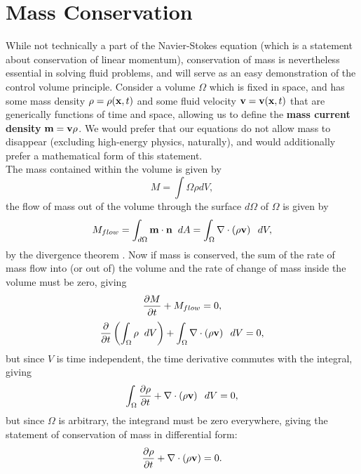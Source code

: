 \section{Mass Conservation}
While not technically a part of the Navier-Stokes equation (which is a statement about conservation of linear momentum), conservation of mass is nevertheless essential in solving fluid problems, and will serve as an easy demonstration of the control volume principle. Consider a volume $\Omega$ which is fixed in space, and has some mass density $\rho = \rho(\mathbf{x},t)$ and some fluid velocity $\mathbf{v} = \mathbf{v}(\mathbf{x} ,t)$ that are generically functions of time and space, allowing us to define the {\bf mass current density} $\mathbf{m} = \mathbf{v}\rho$. We would prefer that our equations do not allow mass to disappear (excluding high-energy physics, naturally), and would additionally prefer a mathematical form of this statement. \\

The mass contained within the volume is given by 
\begin{equation}
M = \int{\Omega}{}{\rho}{dV},
\end{equation}
the flow of mass out of the volume through the surface $d\Omega$ of $\Omega$ is given by 
\begin{equation}
M_{flow} = \int{d\Omega}{}{\Vector{m}\cdot\Vector{n}}{dA} = \int{\Omega}{}{\Div{\paren{\rho\Vector{v}}}}{dV},
\end{equation}
by the divergence theorem .  Now if mass is conserved, the sum of the rate of mass flow into (or out of) the volume and the rate of change of mass inside the volume must be zero, giving
\begin{equation}
\pder{1}{M}{t} + M_{flow} = 0,
\end{equation}
\begin{equation}
\pder{1}{}{t}\paren{\int{\Omega}{}{\rho}{dV}} + \int{\Omega}{}{\Div{\paren{\rho\Vector{v}}}}{dV} =0,
\end{equation}
but since $V$ is time independent, the time derivative commutes with the integral, giving 
\begin{equation}
\int{\Omega}{}{\pder{1}{\rho}{t} + \Div{\paren{\rho\Vector{v}}}}{dV} = 0,
\end{equation}
but since $\Omega$ is arbitrary, the integrand must be zero everywhere, giving the statement of conservation of mass in differential form:
\begin{equation}\label{eq:consMassFull}
\pder{1}{\rho}{t} + \Div{\paren{\rho\Vector{v}} }= 0.
\end{equation}

